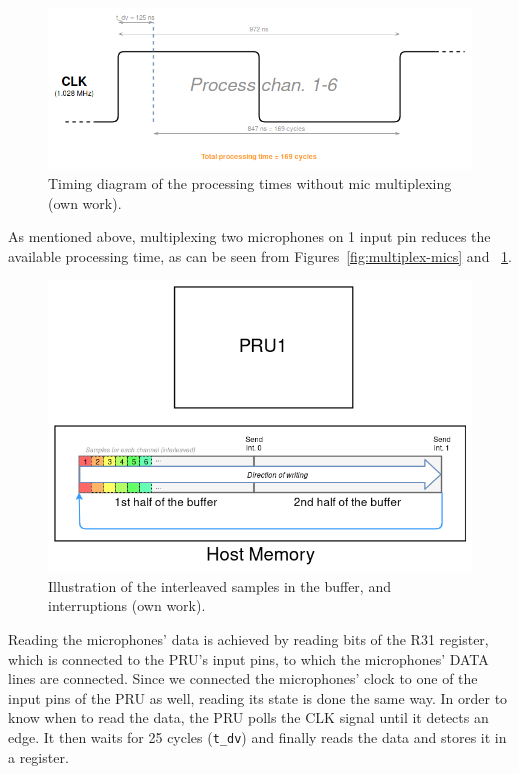 \documentclass[]{report}
\begin{document}
\begin{figure}[H]
\centering
\includegraphics[width=1.0\linewidth]{Pictures/PRU_timing_diagram_no_mic_multiplexing.png}
\caption{Timing diagram of the processing times without mic
multiplexing (own work).}
\label{fig:nonmultiplex-mics}
\end{figure}

As mentioned above, multiplexing two microphones on 1 input pin reduces
the available processing time, as can be seen from Figures~\ref{fig:multiplex-mics} and ~\ref{fig:nonmultiplex-mics}.

\begin{figure}
\centering
\includegraphics[width=0.8\linewidth]{Pictures/PRU_buffer.png}
\caption{Illustration of the interleaved samples in the buffer, and
interruptions (own work).}
\end{figure}

Reading the microphones' data is achieved by reading bits of the R31 register, which is connected to the PRU's input pins, to which the microphones' DATA lines are connected. Since we connected the microphones' clock to one of the input pins of the PRU as well, reading its state is done the same way. In order to know when to read the data, the PRU polls the CLK signal until it detects an edge. It then waits for 25 cycles (\texttt{t\_dv}) and finally reads the data and stores it in a register.
\end{document}
